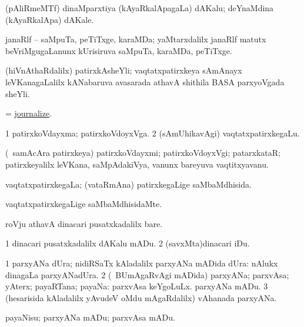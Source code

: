 \noindent
\gl{\pagu}
\bmng
{} (pAliRmeMTf) dinaMparxtiya (kAyaRkalApagaLa) dAKalu; deYnaMdina (kAyaRkalApa) dAKale. 
\emng
\eentry

\bentry
{}
\gl{\nA}
\bmng
janaRlf -- saMpuTa, peTiTxge, karaMDa; yaMtarxdalilx janaRlf matutx beVriMgugaLanunx kUrisiruva saMpuTa, karaMDa, peTiTxge. 
\emng
\eentry

\bentry
{}
\gl{\nA}
\bmng
(hiVnAthaRdalilx) patirxkAsheYli; vaqtatxpatirxkeya sAmAnayx leVKanagaLalilx kANabaruva avasarada athavA shithila BASA parxyoVgada sheYli. 
\emng
\eentry

\bentry
{}
\gl{\kirx}
\bmng
 = \hyperlink{journalize}{journalize}. 
\emng
\eentry

\bentry
{}
\gl{\nA}
\bmng
\bnum
\num{1} patirxkoVdayxma; patirxkoVdoyxVga. 
\num{2} (sAmUhikavAgi) vaqtatxpatirxkegaLu. 
\enum
\emng
\eentry

\bentry
{}
\gl{\nA}
\bmng
(\kanmu\ samAcAra patirxkeya) patirxkoVdayxmi; patirxkoVdoyxVgi; patarxkataR; patirxkeyalilx leVKana, saMpAdakiVya, \mo vanunx bareyuva vaqtitxyavanu. 
\emng
\eentry

\bentry
{}
\gl{\gu}
\bmng
vaqtatxpatirxkegaLa; (vataRmAna) patirxkegaLige saMbaMdhisida. 
\emng
\eentry

\bentry
{}
\gl{\kirxvi}
\bmng
vaqtatxpatirxkegaLige saMbaMdhisidaMte. 
\emng
\eentry

\bentry
{}
\gl{\sakirx}
\bmng
roVju athavA dinacari pusatxkadalilx bare. 
\emng

\noindent
\gl{\akirx}
\bmng
\bnum
\num{1} dinacari pusatxkadalilx dAKalu mADu. 
\num{2} (savxMta)dinacari iDu. 
\enum
\emng
\eentry

\bentry
{}
\gl{\nA}
\bmng
\bnum
\num{1} parxyANa dUra; nidiRSaTx kAladalilx parxyANa mADida dUra:  nAlukx dinagaLa parxyANadUra. 
\num{2} (\sA\ BUmAgaRvAgi mADida) parxyANa; parxvAsa; yAterx; payaRTana; payaNa:  parxvAsa keYgoLuLx.  parxyANa mADu. 
\num{3} (hesarisida kAladalilx yAvudeV oMdu mAgaRdalilx) vAhanada parxyANa. 
\enum
\emng
\eentry

\bentry
{}
\gl{\akirx}
\bmng
payaNisu; parxyANa mADu; parxvAsa mADu. 
\emng
\eentry

